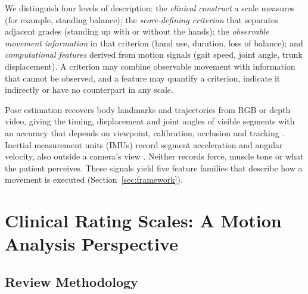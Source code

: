 \documentclass[11pt]{article}
\begin{document}
We distinguish four levels of description: the \emph{clinical construct} a scale measures (for example, standing balance); the \emph{score-defining criterion} that separates adjacent grades (standing up with or without the hands); the \emph{observable movement information} in that criterion (hand use, duration, loss of balance); and \emph{computational features} derived from motion signals (gait speed, joint angle, trunk displacement). A criterion may combine observable movement with information that cannot be observed, and a feature may quantify a criterion, indicate it indirectly or have no counterpart in any scale.

Pose estimation recovers body landmarks and trajectories from RGB or depth video, giving the timing, displacement and joint angles of visible segments with an accuracy that depends on viewpoint, calibration, occlusion and tracking \cite{S3Luvizutto202234115576,S3Lonini202235224426,S3John202437682075}. Inertial measurement units (IMUs) record segment acceleration and angular velocity, also outside a camera's view \cite{S3OBrien202236304845,Yang2013SpatiotemporalGait}. Neither records force, muscle tone or what the patient perceives. These signals yield five feature families that describe how a movement is executed (Section~\ref{sec:framework}).

\section{Clinical Rating Scales: A Motion Analysis Perspective}
\label{sec:scales}

\subsection{Review Methodology}
\end{document}
